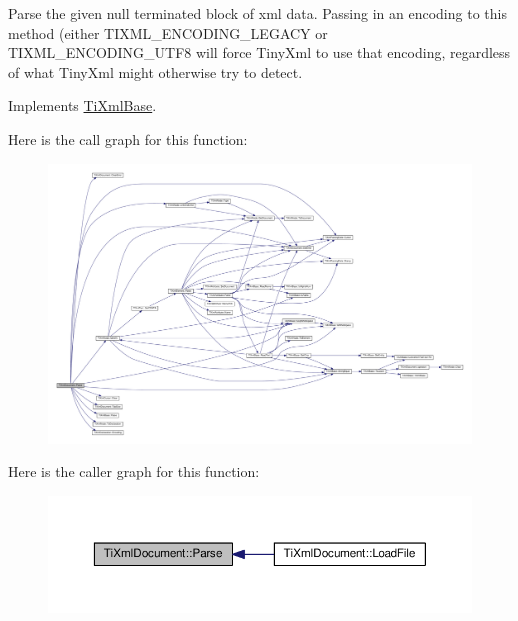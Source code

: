 Parse the given null terminated block of xml data. Passing in an encoding to this method (either T\+I\+X\+M\+L\+\_\+\+E\+N\+C\+O\+D\+I\+N\+G\+\_\+\+L\+E\+G\+A\+CY or T\+I\+X\+M\+L\+\_\+\+E\+N\+C\+O\+D\+I\+N\+G\+\_\+\+U\+T\+F8 will force Tiny\+Xml to use that encoding, regardless of what Tiny\+Xml might otherwise try to detect. 

Implements \hyperlink{class_ti_xml_base_a00e4edb0219d00a1379c856e5a1d2025}{Ti\+Xml\+Base}.

Here is the call graph for this function\+:\nopagebreak
\begin{figure}[H]
\begin{center}
\leavevmode
\includegraphics[width=350pt]{class_ti_xml_document_a789ad2f06f93d52bdb5570b2f3670289_cgraph}
\end{center}
\end{figure}
Here is the caller graph for this function\+:\nopagebreak
\begin{figure}[H]
\begin{center}
\leavevmode
\includegraphics[width=350pt]{class_ti_xml_document_a789ad2f06f93d52bdb5570b2f3670289_icgraph}
\end{center}
\end{figure}
\mbox{\label{class_ti_xml_document_aa4e8c1498a76dcde7191c683e1220882}} 
